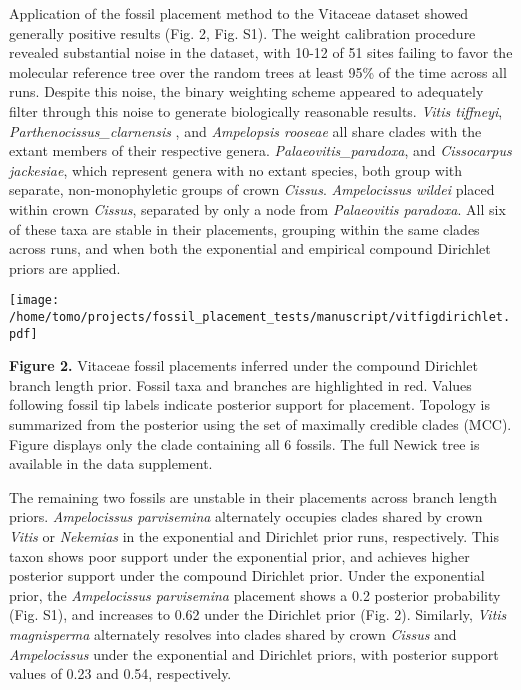 \documentclass[12pt]{article}
\begin{document}
Application of the fossil placement method to the Vitaceae dataset
showed generally positive results (Fig. 2, Fig. S1). The weight calibration procedure
revealed substantial noise in the dataset, with 10-12 of 51 sites
failing to favor the molecular reference tree over the random trees at
least 95\% of the time across all runs. Despite this noise, the binary
weighting scheme appeared to adequately filter through this noise to
generate biologically reasonable results. \emph{Vitis tiffneyi},
\emph{Parthenocissus\_clarnensis} , and \emph{Ampelopsis rooseae} all
share clades with the extant members of their respective genera.
\emph{Palaeovitis\_paradoxa}, and \emph{Cissocarpus jackesiae}, which
represent genera with no extant species, both group with
separate, non-monophyletic groups of crown \emph{Cissus}.
\emph{Ampelocissus wildei} placed within crown
\emph{Cissus}, separated by only a node from \emph{Palaeovitis
paradoxa}. All six of these taxa are stable in their placements,
grouping within the same clades across runs, and when both the
exponential and empirical compound Dirichlet priors are applied.

\texttt{[image: /home/tomo/projects/fossil\_placement\_tests/manuscript/vitfigdirichlet.pdf]}

\textbf{Figure 2.}  Vitaceae fossil placements inferred
under the compound Dirichlet branch length prior. Fossil taxa and
branches are highlighted in red. Values following fossil tip labels
indicate posterior support for placement. Topology is summarized from
the posterior using the set of maximally credible clades (MCC). 
Figure displays only the clade containing all 6 fossils. The full Newick tree is available in the data supplement.

The remaining two fossils are  unstable in their
placements across branch length priors. \emph{Ampelocissus parvisemina}
alternately occupies  clades shared by crown \emph{Vitis} or
\emph{Nekemias} in the  exponential and Dirichlet prior runs,
respectively. This taxon shows poor support under the exponential prior, and achieves 
higher posterior support under the compound Dirichlet prior.
 Under the exponential prior, the \emph{Ampelocissus parvisemina} placement shows a 0.2
posterior probability (Fig. S1), and increases  to 0.62 under the Dirichlet
prior (Fig. 2). Similarly, \emph{Vitis magnisperma} alternately resolves into
clades shared by crown \emph{Cissus} and \emph{Ampelocissus} under the
exponential and Dirichlet priors, with posterior support values of 0.23
and 0.54, respectively. 
\end{document}
